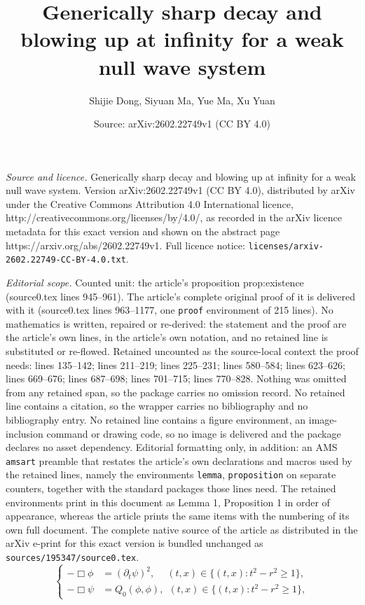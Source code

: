 \documentclass[10pt,a4paper]{amsart}
\title{Generically sharp decay and blowing up at infinity for a weak null wave system}
\author{Shijie Dong, Siyuan Ma, Yue Ma, Xu Yuan}
\date{Source: arXiv:2602.22749v1 (CC BY 4.0)}
\def \pt{\partial_{t}}
\begin{document}
\maketitle

\noindent\emph{Source and licence.} Generically sharp decay and blowing up at infinity for a weak null wave system. Version arXiv:2602.22749v1 (CC BY 4.0), distributed by arXiv under the Creative Commons Attribution 4.0 International licence, http://creativecommons.org/licenses/by/4.0/, as recorded in the arXiv licence metadata for this exact version and shown on the abstract page https://arxiv.org/abs/2602.22749v1. Full licence notice: \texttt{licenses/arxiv-2602.22749-CC-BY-4.0.txt}.\par\smallskip

\noindent\textit{Editorial scope.} Counted unit: the article's proposition prop:existence (source0.tex lines 945--961). The article's complete original proof of it is delivered with it (source0.tex lines 963--1177, one \texttt{proof} environment of 215 lines). No mathematics is written, repaired or re-derived: the statement and the proof are the article's own lines, in the article's own notation, and no retained line is substituted or re-flowed.  Retained uncounted as the source-local context the proof needs: lines 135--142; lines 211--219; lines 225--231; lines 580--584; lines 623--626; lines 669--676; lines 687--698; lines 701--715; lines 770--828.  Nothing was omitted from any retained span, so the package carries no omission record.  No retained line contains a citation, so the wrapper carries no bibliography and no bibliography entry.  No retained line contains a figure environment, an image-inclusion command or drawing code, so no image is delivered and the package declares no asset dependency.  Editorial formatting only, in addition: an AMS \texttt{amsart} preamble that restates the article's own declarations and macros used by the retained lines, namely the environments \texttt{lemma}, \texttt{proposition} on separate counters, together with the standard packages those lines need.  The retained environments print in this document as Lemma 1, Proposition 1 in order of appearance, whereas the article prints the same items with the numbering of its own full document.  The complete native source of the article as distributed in the arXiv e-print for this exact version is bundled unchanged as \texttt{sources/195347/source0.tex}.
 \begin{equation}\label{equ:main}
    \left\{
    \begin{aligned}
        -\Box \phi&=\left(\pt \psi\right)^{2},\quad \ (t, x)\in \{ (t,x):t^2 -r^2 \geq 1 \},
        \\
        -\Box \psi&=Q_{0}(\phi,\phi),\ \  (t, x)\in \{ (t,x):t^2 -r^2 \geq 1 \},
    \end{aligned}\right.
 \end{equation}
\end{document}

